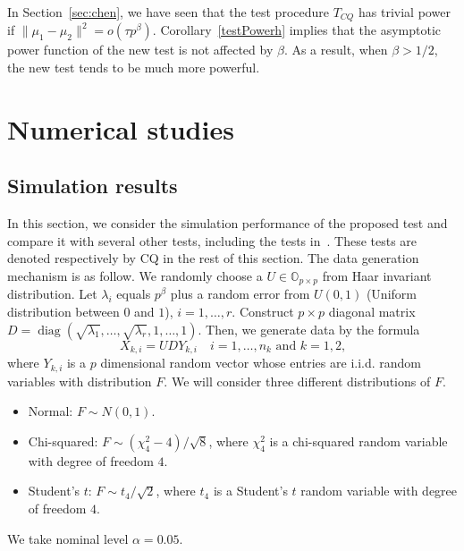 \documentclass[review]{elsarticle}
\DeclareMathOperator{\mydiag}{diag}
\theoremstyle{plain}
\theoremstyle{definition}
\theoremstyle{remark}
\begin{document}
 In Section~\ref{sec:chen}, we have seen that the test procedure $T_{CQ}$ has trivial power if $\|\mu_1-\mu_2\|^2=o(\tau p^{\beta})$.
Corollary~\ref{testPowerh} implies that the asymptotic power function of the new test is not affected by $\beta$.
 As a result, when $\beta>1/2$, the new test tends to be much more powerful.





\section{Numerical studies}
\subsection{Simulation results}


In this section, we consider the simulation performance of the proposed test and compare it with several other tests, including the tests in~\cite{Chen2010A}.
These tests are denoted respectively by CQ in the rest of this section.
The data generation mechanism is as follow.
We randomly choose a $U\in\mathbb{O}_{p\times p}$ from Haar invariant distribution.
Let $\lambda_{i}$ equals $p^{\beta}$ plus a random error from $U(0,1)$ (Uniform distribution between $0$ and $1$), $i=1,\ldots, r$.
Construct $p\times p$ diagonal matrix $D=\mydiag(\sqrt{\lambda_1},\ldots,\sqrt{\lambda_r}, 1,\ldots, 1)$.
Then, we generate data by the formula
$$
X_{k,i}=U D Y_{k,i}\quad \text{$i=1,\ldots,n_k$ and $k=1,2$,}
$$
where $Y_{k,i}$ is a $p$ dimensional random vector whose entries are i.i.d. random variables with distribution $F$.
We will consider three different distributions of $F$.
\begin{itemize}
    \item
        Normal: $F\sim N(0,1)$.
    \item
        Chi-squared:  $F\sim (\chi^2_4-4)/\sqrt{8}$, where $\chi^2_4$ is a chi-squared random variable with degree of freedom $4$.
    \item
        Student's $t$: $F\sim t_4/\sqrt{2}$, where $t_4$ is a Student's $t$ random variable  with degree of freedom $4$.
\end{itemize}
We take nominal level $\alpha=0.05$.
\end{document}
